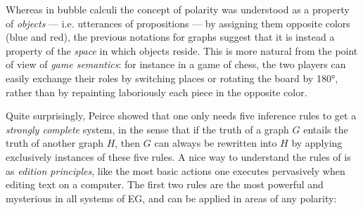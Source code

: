\begin{remark}
  Whereas in bubble calculi the concept of polarity was understood as a property
  of \emph{objects} --- i.e. utterances of propositions --- by assigning them
  opposite colors (blue and red), the previous notations for graphs suggest that
  it is instead a property of the \emph{space} in which objects reside. This is
  more natural from the point of view of \emph{game semantics}: for instance in
  a game of chess, the two players can easily exchange their roles by switching
  places or rotating the board by 180°, rather than by repainting laboriously
  each piece in the opposite color.
\end{remark}

Quite surprisingly, Peirce showed that one only needs five inference rules to get
a \emph{strongly complete} system, in the sense that if the truth of a graph $G$
entails the truth of another graph $H$, then $G$ can always be rewritten into
$H$ by applying exclusively instances of these five rules. A nice way to understand the rules of  is as \emph{edition
principles}, like the most basic actions one executes pervasively when editing
text on a computer. The first two rules are the
most powerful and mysterious in all systems of EG, and can be applied in areas
of any polarity:
